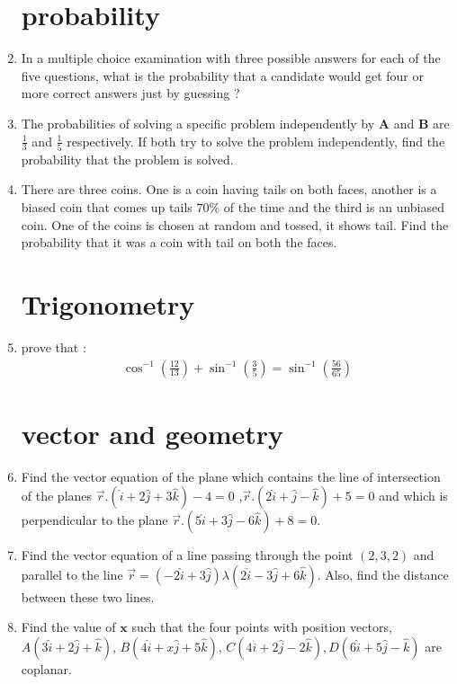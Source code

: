 \documentclass[12pt,-letter paper]{article}
\let\vec\mathbf{}
\let\vec\mathbf{}
\let\vec\mathbf{}
\providecommand{\brak}[1]{\ensuremath{\left(#1\right)}}
\begin{document}
\begin{enumerate}
\section{probability}
\item In a multiple choice examination with three possible answers for each of the five questions, what is the probability that a candidate would get four or more correct answers just by guessing ?

\item The probabilities of solving a specific problem independently by $\vec{A}$ and $\vec{B}$ are $\frac{1}{3}$ and $\frac{1}{5}$ respectively. If both try to solve the problem independently, find the probability that the problem is solved.

\item There are three coins. One is a coin having tails on both faces, another is a biased coin that comes up tails $70\%$ of the time and the third is an unbiased coin. One of the coins is chosen at random and tossed, it shows tail. Find the probability that it was a coin with tail on both the faces.

\section{Trigonometry}
\item prove that :
\begin{align*}
\cos^{-1}\brak{\frac{12}{13}}+\sin^{-1}\brak{\frac{3}{5}}=\sin^{-1} \brak{\frac{56}{65}}
\end{align*}

\section{vector and  geometry}
\item Find the vector equation of the plane which contains the line of intersection of the planes 
$ \overrightarrow{r}.\brak{\hat{i} + 2\hat{j}+3\hat{k}}-4=0$ ,$\overrightarrow{r}.
\brak{2\hat{i} + \hat{j} - \hat{k}}+5=0$ and which is perpendicular to the plane $\overrightarrow{r}.\brak{5\hat{i} + 3\hat{j} - 6\hat{k}}+8=0$.

\item Find the vector equation of a line passing through the point
$\brak{2, 3, 2}$ and parallel to the line
$\overrightarrow{r}=\brak{-2\hat{i} +3\hat{j}}\lambda\brak{2\hat{i} - 3\hat{j}+6\hat{k}}$.
Also, find the distance between these two lines.

\item Find the value of $\vec{x}$ such that the four points with position vectors,
$A\brak{3\hat{i} + 2\hat{j} + \hat{k}}$, $B\brak{4\hat{i} + x\hat{j} + 5\hat{k}}$,  
$C\brak{4\hat{i} + 2\hat{j} -2 \hat{k}},D\brak{6\hat{i} + 5\hat{j} - \hat{k}}$ are coplanar.


\end{enumerate}
\end{document}
